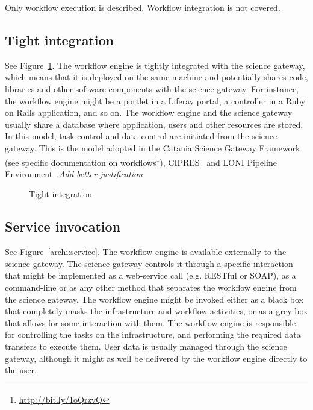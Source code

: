 \documentclass[preprint,3p,twocolumn]{elsarticle}
\newcommand{\todo}[1]{\color{blue}\xspace\emph{#1}\xspace\color{black}}
\begin{document}
Only workflow execution is described. 
Workflow integration is not covered. 

\subsection{Tight integration}

See Figure~\ref{archi:tight}. The workflow engine is tightly
integrated with the science gateway, which means that it is deployed
on the same machine and potentially shares code, libraries and other
software components with the science gateway. For instance, the
workflow engine might be a portlet in a Liferay portal, a controller
in a Ruby on Rails application, and so on. The workflow engine and the
science gateway usually share a database where application, users and
other resources are stored. In this model, task control and data
control are initiated from the science gateway. This is the model
adopted in the Catania Science Gateway Framework~\cite{Ardizzone2012}
(see specific documentation on
workflows\footnote{\url{http://bit.ly/1oQrzvQ}}),
CIPRES~\cite{miller2010creating} and LONI Pipeline
Environment~\cite{dinov2009efficient}.\todo{Add better justification}

\begin{figure}
\centering
\def\svgwidth{0.5\columnwidth}

\caption{Tight integration}
\label{archi:tight}
\end{figure}

\subsection{Service invocation}

See Figure~\ref{archi:service}. The workflow engine is available
externally to the science gateway. The science gateway controls it
through a specific interaction that might be implemented as a
web-service call (e.g. RESTful or SOAP), as a command-line or as any
other method that separates the workflow engine from the science
gateway. The workflow engine might be invoked either as a black box
that completely masks the infrastructure and workflow activities, or
as a grey box that allows for some interaction with them.  The
workflow engine is responsible for controlling the tasks on the
infrastructure, and performing the required data transfers to execute
them. User data is usually managed through the science gateway,
although it might as well be delivered by the workflow engine directly
to the user.
\end{document}
